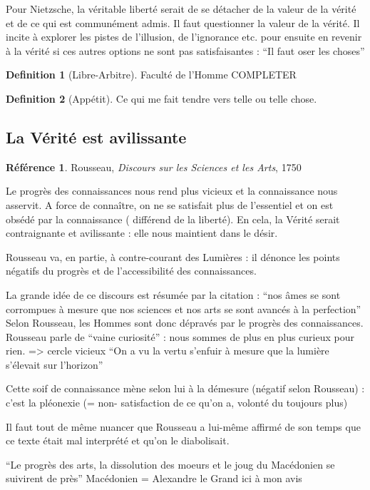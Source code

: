 \documentclass[french]{book}
\theoremstyle{definition}
\newtheorem*{dfn}{Definition}
\newtheorem*{refe}{Référence}
\begin{document}
Pour Nietzsche, la véritable liberté serait de se détacher de la valeur de la vérité et de ce qui est communément admis. Il faut questionner la valeur de la vérité.
Il incite à explorer les pistes de l’illusion, de l’ignorance etc. pour ensuite en revenir à la vérité si ces autres options ne sont pas satisfaisantes :
“Il faut oser les choses”

\begin{dfn}[Libre-Arbitre]
Faculté de l’Homme COMPLETER
\end{dfn}


\begin{dfn}[Appétit]
Ce qui me fait tendre vers telle ou telle chose.
\end{dfn}


\subsection{La Vérité est avilissante}

\begin{refe}
	Rousseau, \textit{Discours sur les Sciences et les Arts}, 1750
\end{refe}

Le progrès des connaissances nous rend plus vicieux et la connaissance nous asservit. A force de connaître, on ne se satisfait plus de l’essentiel et on est obsédé par la connaissance ( différend de la liberté). En cela, la Vérité serait contraignante et avilissante : elle nous maintient dans le désir.

Rousseau va, en partie, à contre-courant des Lumières : il dénonce les points négatifs du progrès et de l'accessibilité des connaissances.

La grande idée de ce discours est résumée par la citation :
“nos âmes se sont corrompues à mesure que nos sciences et nos arts se sont avancés à la perfection”
Selon Rousseau, les Hommes sont donc dépravés par le progrès des connaissances.
Rousseau parle de “vaine curiosité” : nous sommes de plus en plus curieux pour rien. => cercle vicieux
“On a vu la vertu s’enfuir à mesure que la lumière s’élevait sur l’horizon”

Cette soif de connaissance mène selon lui à la démesure (négatif selon Rousseau) : c’est la pléonexie (= non- satisfaction de ce qu’on a, volonté du toujours plus)

Il faut tout de même nuancer que Rousseau a lui-même affirmé de son temps que ce texte était mal interprété et qu’on le diabolisait.

“Le progrès des arts, la dissolution des moeurs et le joug du Macédonien se suivirent de près”
Macédonien = Alexandre le Grand ici à mon avis
\end{document}
